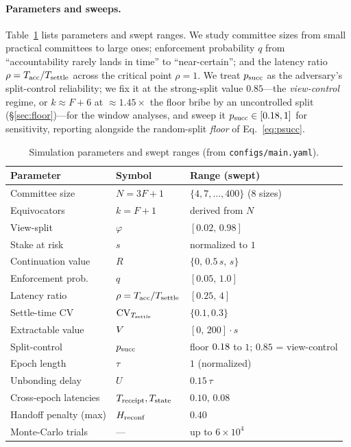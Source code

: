 \paragraph{Parameters and sweeps.}
Table~\ref{tab:params} lists parameters and swept ranges. We study committee sizes from small
practical committees to large ones; enforcement probability $q$ from ``accountability rarely lands in
time'' to ``near-certain''; and the latency ratio $\rho=T_{\mathrm{acc}}/T_{\mathrm{settle}}$ across the critical point
$\rho=1$. We treat $p_{\mathrm{succ}}$ as the adversary's split-control reliability; we fix it at the strong-split
value $0.85$---the \emph{view-control} regime, or $k\approx F{+}6$ at ${\approx}1.45\times$ the floor
bribe by an uncontrolled split (\S\ref{sec:floor})---for the window analyses, and sweep it
$p_{\mathrm{succ}}\in[0.18,1]$ for sensitivity, reporting alongside the random-split \emph{floor}
of Eq.~\eqref{eq:psucc}.

\begin{table}[t]
\centering
\caption{Simulation parameters and swept ranges (from \texttt{configs/main.yaml}).}
\label{tab:params}
\small
\begin{tabularx}{\linewidth}{@{}llX@{}}
\toprule
Parameter & Symbol & Range (swept) \\
\midrule
Committee size & $N=3F{+}1$ & $\{4,7,\ldots,400\}$ (8 sizes) \\
Equivocators & $k=F{+}1$ & derived from $N$ \\
View-split & $\varphi$ & $[0.02,\,0.98]$ \\
Stake at risk & $s$ & normalized to $1$ \\
Continuation value & $R$ & $\{0,\,0.5\,s,\,s\}$ \\
Enforcement prob. & $q$ & $[0.05,\,1.0]$ \\
Latency ratio & $\rho=T_{\mathrm{acc}}/T_{\mathrm{settle}}$ & $[0.25,\,4]$ \\
Settle-time CV & $\mathrm{CV}_{T_{\mathrm{settle}}}$ & $\{0.1,0.3\}$ \\
Extractable value & $V$ & $[0,\,200]\cdot s$ \\
Split-control & $p_{\mathrm{succ}}$ & floor $0.18$ to $1$; $0.85$ = view-control \\
Epoch length & $\tau$ & $1$ (normalized) \\
Unbonding delay & $U$ & $0.15\,\tau$ \\
Cross-epoch latencies & $T_{\mathrm{receipt}},T_{\mathrm{state}}$ & $0.10,\,0.08$ \\
Handoff penalty (max) & $H_{\mathrm{reconf}}$ & $0.40$ \\
Monte-Carlo trials & --- & up to $6{\times}10^4$ \\
\bottomrule
\end{tabularx}
\end{table}

